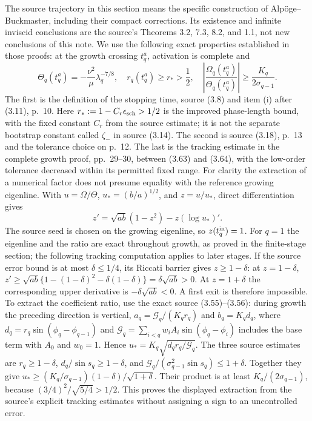 The source trajectory in this section means the specific construction
of Alp\"oge--Buckmaster, including their compact corrections. Its
existence and infinite inviscid conclusions are the source's
Theorems 3.2, 7.3, 8.2, and 1.1, not new conclusions of this note.
We use the following exact properties established in those proofs:
at the growth crossing $t_q^a$, activation is complete and
\begin{equation}
 \Theta_q(t_q^a)=-\frac{\nu^2}{\mu}\lambda_q^{-7/8},
 \quad r_q(t_q^a)\geq r_*>\frac12,
 \quad \left|\frac{\Omega_q(t_q^a)}{\Theta_q(t_q^a)}\right|
 \geq\frac{K_q}{2\sigma_{q-1}}.
 \label{cvlane:eq:sourcecrossingbounds}
\end{equation}
The first is the definition of the stopping time, source (3.8)
and item (i) after (3.11), p.~10. Here $r_*:=1-C_r\epsilon_{\rm sch}>1/2$ is the improved phase-length bound, with the fixed constant $C_r$ from the source estimate; it is not the separate bootstrap constant called $\zeta_-$ in source (3.14). The second is source (3.18),
p.~13 and the tolerance choice on p.~12. The last is the
tracking estimate in the complete growth proof, pp.~29--30,
between (3.63) and (3.64), with the low-order tolerance decreased
within its permitted fixed range. For clarity the extraction of
a numerical factor does not presume equality with the reference
growing eigenline. With $u=\Omega/\Theta$, $u_*=(b/a)^{1/2}$,
and $z=u/u_*$, direct differentiation gives
\[
 z'=\sqrt{ab}(1-z^2)-z(\log u_*)'.
\]
The source seed is chosen on the growing eigenline, so
$z(t_q^{\rm in})=1$. For $q=1$ the eigenline and the ratio
are exact throughout growth, as proved in the finite-stage
section; the following tracking computation applies to later
stages.
If the source error bound is at most $\delta\leq1/4$, its
Riccati barrier gives $z\geq1-\delta$: at $z=1-\delta$,
$z'\geq\sqrt{ab}\{1-(1-\delta)^2-\delta(1-\delta)\}
=\delta\sqrt{ab}>0$. At $z=1+\delta$ the corresponding
upper derivative is $-\delta\sqrt{ab}<0$. A first exit is
therefore impossible. To extract the coefficient ratio, use the
exact source (3.55)--(3.56): during growth the preceding direction
is vertical, $a_q=\mathcal G_q/(K_qr_q)$ and $b_q=K_qd_q$,
where $d_q=r_q\sin(\phi_q-\phi_{q-1})$ and
$\mathcal G_q=\sum_{i<q}w_iA_i\sin(\phi_q-\phi_i)$ includes
the base term with $A_0$ and $w_0=1$. Hence
$u_*=K_q\sqrt{d_qr_q/\mathcal G_q}$. The three source estimates
are $r_q\geq1-\delta$, $d_q/\sin s_q\geq1-\delta$, and
$\mathcal G_q/(\sigma_{q-1}^2\sin s_q)\leq1+\delta$.
Together they give
$u_*\geq(K_q/\sigma_{q-1})(1-\delta)/\sqrt{1+\delta}$.
Their product is at least $K_q/(2\sigma_{q-1})$, because
$(3/4)^2/\sqrt{5/4}>1/2$. This proves the displayed extraction
from the source's explicit tracking estimates without assigning
a sign to an uncontrolled error.

